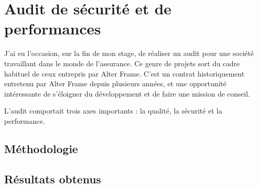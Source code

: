 \section{Audit de sécurité et de performances}
\label{sec:audit}
J'ai eu l'occasion, sur la fin de mon stage, de réaliser un audit pour une société travaillant dans le monde de l'assurance. Ce genre de projets sort du cadre habituel de ceux entrepris par Alter Frame. C'est un contrat historiquement entretenu par Alter Frame depuis plusieurs années, et une opportunité intéressante de s'éloigner du développement et de faire une mission de conseil. 

L'audit comportait trois axes importants : la qualité, la sécurité et la performance. 

\subsection{Méthodologie}
\subsection{Résultats obtenus}
